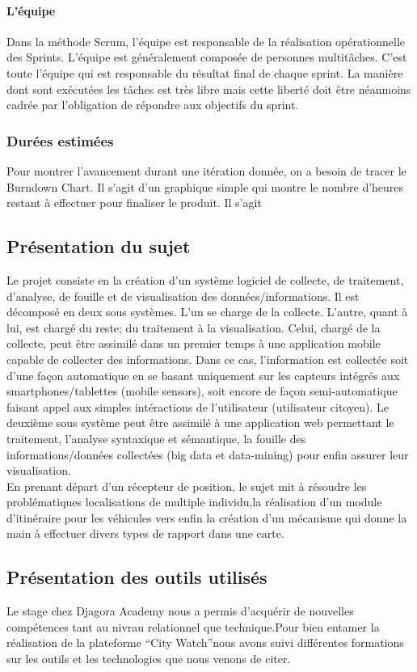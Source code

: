 \paragraph{L'équipe}
Dans la méthode Scrum, l’équipe est responsable de la réalisation
opérationnelle des Sprints. L’équipe est généralement composée de personnes
multitâches. C’est toute l’équipe qui est responsable du résultat final de chaque sprint.
La manière dont sont exécutées les tâches est très libre mais cette liberté doit être
néanmoins cadrée par l’obligation de répondre aux objectifs du sprint.
\subsubsection{Durées estimées}
Pour montrer l’avancement durant une itération donnée, on a besoin de tracer le
Burndown Chart. Il s’agit d’un graphique simple qui montre le nombre d’heures restant
à effectuer pour finaliser le produit. Il s’agit
\subsection{Présentation du sujet}
 Le projet consiste en la création d'un système logiciel de collecte, 
 de traitement, d'analyse, de fouille et de visualisation des données/informations.
 Il est décomposé en deux sous systèmes. L'un se charge de la collecte. L'autre,
 quant à lui, est chargé du reste; du traitement à la visualisation. 
 Celui, chargé de la collecte, peut être assimilé dans un premier temps 
 à une application mobile capable de collecter des informations. Dans ce cas, 
 l'information est collectée soit d'une façon automatique en se basant uniquement 
 sur les capteurs intégrés aux smartphones/tablettes (mobile sensors), 
 soit encore de façon semi-automatique faisant appel aux simples intéractions 
 de l'utilisateur (utilisateur citoyen). Le deuxième sous système peut être 
 assimilé à une application web permettant le traitement, l'analyse syntaxique
 et sémantique, la fouille des informations/données collectées (big data et
 data-mining) pour enfin assurer leur visualisation. \\
En prenant départ d'un récepteur de position, le sujet mit à résoudre les
problématiques localisations de multiple individu,la réalisation d'un module
d'itinéraire pour les véhicules vers enfin la création d'un mécanisme qui donne
la main à effectuer divers types de rapport dans une carte.

\subsection{Présentation des outils utilisés}
Le stage chez Djagora Academy nous a permis d'acquérir de nouvelles
compétences tant au nivrau relationnel que technique.Pour bien entamer la réalisation
de la plateforme 
``City Watch''nous avons suivi différentes
formations sur les outils et les technologies que nous venons de citer. 
